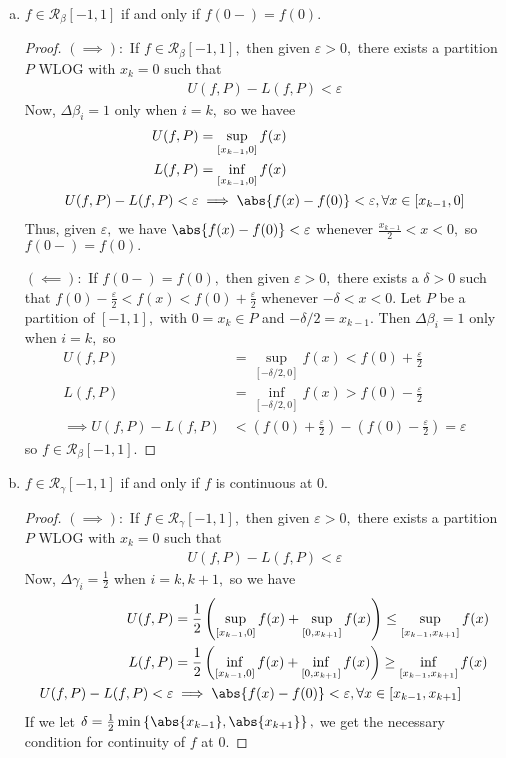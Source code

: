 \documentclass{article}
\begin{document}
\begin{itemize}
\begin{enumerate}[(a)]
			\item $f\in\mathcal R_\beta[-1, 1]$ if and only if $f(0-)=f(0).$
				\begin{proof}
					$(\implies):$ If $f\in\mathcal R_\beta[-1, 1],$ then given $\varepsilon>0,$ there exists a partition $P$ WLOG with $x_k=0$ such that
					\begin{align*}
						U(f, P)-L(f, P)<\varepsilon
					\end{align*}
					Now, $\Delta\beta_i=1$ only when $i=k,$ so we havee
					\begin{align*}
						U(f, P) &= \sup_{[x_{k-1}, 0]} f(x) \\
						L(f, P) &= \inf_{[x_{k-1}, 0]} f(x) \\
						U(f, P)-L(f, P) <\varepsilon &\implies \abs{f(x)-f(0)}<\varepsilon, \forall x\in [x_{k-1}, 0]
					\end{align*}
					Thus, given $\varepsilon,$ we have $\abs{f(x)-f(0)}<\varepsilon$ whenever $\frac{x_{k-1}}{2}<x<0,$ so $f(0-)=f(0).$
	
					$(\impliedby):$ If $f(0-)=f(0),$ then given $\varepsilon>0,$ there exists a $\delta>0$ such that $f(0)-\frac{\varepsilon}{2}<f(x)<f(0)+\frac{\varepsilon}{2}$ whenever $-\delta<x<0.$ Let $P$ be a partition of $[-1, 1],$ with $0=x_k\in P$ and $-\delta/2=x_{k-1}.$ Then $\Delta\beta_i=1$ only when $i=k,$ so
					\begin{align*}
						U(f, P) &= \sup_{[-\delta/2, 0]} f(x) < f(0)+\frac{\varepsilon}{2} \\
						L(f, P) &= \inf_{[-\delta/2, 0]} f(x) > f(0) - \frac{\varepsilon}{2} \\
						\implies U(f, P) - L(f, P) &< \left( f(0)+\frac{\varepsilon}{2} \right) - \left( f(0)-\frac{\varepsilon}{2} \right) = \varepsilon
					\end{align*}
					so $f\in\mathcal R_\beta[-1, 1].$
				\end{proof}

			\item $f\in\mathcal R_\gamma[-1, 1]$ if and only if $f$ is continuous at 0.
				\begin{proof}
					$(\implies):$ If $f\in \mathcal R_\gamma[-1, 1],$ then given $\varepsilon>0,$ there exists a partition $P$ WLOG with $x_k=0$ such that 
					\begin{align*}
						U(f, P)-L(f, P) < \varepsilon
					\end{align*}
					Now, $\Delta\gamma_i=\frac{1}{2}$ when $i=k, k+1,$ so we have
					\begin{align*}
						U(f, P) &= \frac{1}{2} \left( \sup_{[x_{k-1}, 0]}f(x) + \sup_{[0, x_{k+1}]} f(x) \right) \le \sup_{[x_{k-1}, x_{k+1}]}f(x) \\
						L(f, P) &= \frac{1}{2} \left(  \inf_{[x_{k-1}, 0]}f(x) + \inf_{[0, x_{k+1}]} f(x)\right) \ge \inf_{[x_{k-1}, x_{k+1}]} f(x) \\
						U(f, P)-L(f, P) < \varepsilon &\implies \abs{f(x)-f(0)}<\varepsilon, \forall x\in [x_{k-1}, x_{k+1}]
					\end{align*}
					If we let $\delta=\frac{1}{2}\min\left\{ \abs{x_{k-1}}, \abs{x_{k+1}} \right\},$ we get the necessary condition for continuity of $f$ at 0.


\end{proof}
\end{enumerate}
\end{itemize}
\end{document}
